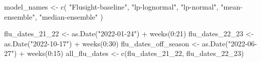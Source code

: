 \documentclass[
]{article}
\newenvironment{Shaded}{\begin{snugshade}}{\end{snugshade}}
\newcommand{\DecValTok}[1]{\textcolor[rgb]{0.68,0.00,0.00}{#1}}
\newcommand{\FunctionTok}[1]{\textcolor[rgb]{0.28,0.35,0.67}{#1}}
\newcommand{\NormalTok}[1]{\textcolor[rgb]{0.00,0.23,0.31}{#1}}
\newcommand{\OtherTok}[1]{\textcolor[rgb]{0.00,0.23,0.31}{#1}}
\newcommand{\SpecialCharTok}[1]{\textcolor[rgb]{0.37,0.37,0.37}{#1}}
\newcommand{\StringTok}[1]{\textcolor[rgb]{0.13,0.47,0.30}{#1}}
\begin{document}
\begin{Shaded}
\begin{Highlighting}[]
\NormalTok{model\_names }\OtherTok{\textless{}{-}} \FunctionTok{c}\NormalTok{(}
  \StringTok{"Flusight{-}baseline"}\NormalTok{, }\StringTok{"lp{-}lognormal"}\NormalTok{, }\StringTok{"lp{-}normal"}\NormalTok{,}
  \StringTok{"mean{-}ensemble"}\NormalTok{, }\StringTok{"median{-}ensemble"}
\NormalTok{)}

\NormalTok{flu\_dates\_21\_22 }\OtherTok{\textless{}{-}} \FunctionTok{as.Date}\NormalTok{(}\StringTok{"2022{-}01{-}24"}\NormalTok{) }\SpecialCharTok{+} \FunctionTok{weeks}\NormalTok{(}\DecValTok{0}\SpecialCharTok{:}\DecValTok{21}\NormalTok{)}
\NormalTok{flu\_dates\_22\_23 }\OtherTok{\textless{}{-}} \FunctionTok{as.Date}\NormalTok{(}\StringTok{"2022{-}10{-}17"}\NormalTok{) }\SpecialCharTok{+} \FunctionTok{weeks}\NormalTok{(}\DecValTok{0}\SpecialCharTok{:}\DecValTok{30}\NormalTok{)}
\NormalTok{flu\_dates\_off\_season }\OtherTok{\textless{}{-}} \FunctionTok{as.Date}\NormalTok{(}\StringTok{"2022{-}06{-}27"}\NormalTok{) }\SpecialCharTok{+} \FunctionTok{weeks}\NormalTok{(}\DecValTok{0}\SpecialCharTok{:}\DecValTok{15}\NormalTok{)}
\NormalTok{all\_flu\_dates }\OtherTok{\textless{}{-}} \FunctionTok{c}\NormalTok{(flu\_dates\_21\_22, flu\_dates\_22\_23)}


\end{Highlighting}
\end{Shaded}
\end{document}
